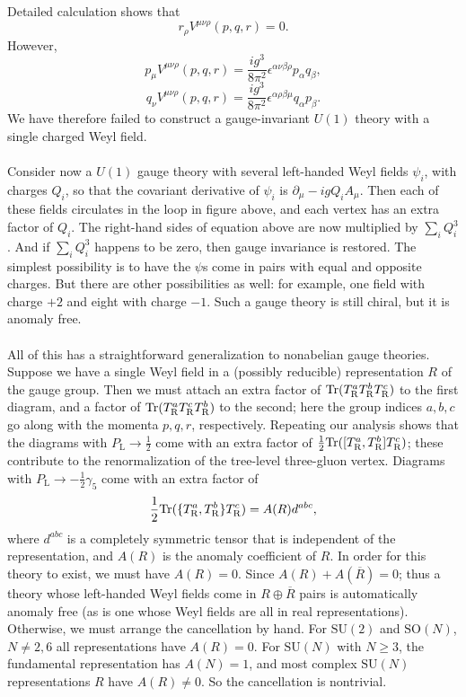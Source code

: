 \noindent
Detailed calculation shows that
\[r_{\rho}V^{\mu\nu\rho}(p,q,r) = 0.\]
However,
\[p_{\mu}V^{\mu\nu\rho}(p,q,r) = \frac{ig^3}{8\pi^2}\epsilon^{\alpha\nu\beta\rho}p_{\alpha}q_{\beta},\]
\[q_{\nu}V^{\mu\nu\rho}(p,q,r) = \frac{ig^3}{8\pi^2}\epsilon^{\alpha\rho\beta\mu}q_{\alpha}p_{\beta}.\]
We have therefore failed to construct a gauge-invariant $U(1)$ theory with a single charged Weyl field.
\\ \\
Consider now a $U(1)$ gauge theory with several left-handed Weyl fields $\psi_i$, with charges $Q_i$, so that the covariant derivative of $\psi_i$ is $\partial_{\mu} - igQ_iA_{\mu}$. Then each of these fields circulates in the loop in figure above, and each vertex has an extra factor of $Q_i$. The right-hand sides of equation above are now multiplied by $\sum_i Q_i^3$. And if $\sum_i Q_i^3$ happens to be zero, then gauge invariance is restored. 
The simplest possibility is to have the $\psi$s come in
pairs with equal and opposite charges. But there are other possibilities as well: for example, one field with charge $+2$ and eight with charge $-1$. Such a gauge theory is still chiral, but it is anomaly free.
\\ \\
All of this has a straightforward generalization to nonabelian gauge theories. 
Suppose we have a single Weyl field in a (possibly reducible) representation $R$ of the gauge group. Then we must attach an extra factor of $\mathrm{Tr}(T^a_{\rm R} T^b_{\rm R} T^c_{\rm R})$ to the first diagram, and a factor of $\mathrm{Tr}(T^a_{\rm R} T^c_{\rm R} T^b_{\rm R})$ to the second; here the group indices $a,b,c$ go along with the momenta $p,q,r$, respectively.
Repeating our analysis shows that the diagrams with $P_{\mathrm{L}} \to \frac{1}{2}$ come with an extra factor of $\frac{1}{2}\mathrm{Tr}([T^a_{\rm R}, T^b_{\rm R}] T^c_{\rm R})$; these contribute to the renormalization of the tree-level three-gluon vertex. Diagrams with $P_{\mathrm{L}} \to - \frac{1}{2}\gamma_5$ come with an extra factor of
\[\frac{1}{2}\mathrm{Tr}(\{T^a_{\rm R}, T^b_{\rm R}\} T^c_{\rm R}) = A(R)d^{abc},\]
where $d^{abc}$ is a completely symmetric tensor that is independent of the representation, and $A(R)$ is the anomaly coefficient of $R$. In order for this theory to exist, we must have $A(R) = 0$. 
Since $A(R) + A(\overline{R}) = 0$; thus a theory whose left-handed Weyl fields come in $R \oplus \overline{R}$ pairs is automatically anomaly free (as is one whose Weyl fields are all in real representations). Otherwise, we must arrange the cancellation by hand. 
For $\mathrm{SU}(2)$ and $\mathrm{SO}(N)$, $N \neq 2,6$ all representations have $A(R) = 0$. For $\mathrm{SU}(N)$ with $N \geq 3$, the fundamental representation has $A(N) = 1$, and most complex $\mathrm{SU}(N)$ representations $R$ have $A(R) \neq 0$. So the cancellation is nontrivial.

